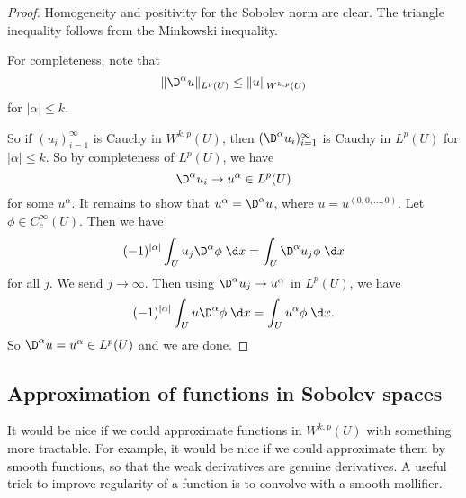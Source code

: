 \documentclass[a4paper]{article}
\begin{document}
\begin{proof}
  Homogeneity and positivity for the Sobolev norm are clear. The triangle inequality follows from the Minkowski inequality.

  For completeness, note that
  \[
    \|\D^\alpha u\|_{L^p(U)} \leq \|u\|_{W^{k, p}(U)}
  \]
  for $|\alpha| \leq k$.

  So if $(u_i)_{i = 1}^\infty$ is Cauchy in $W^{k, p}(U)$, then $(\D^\alpha u_i)_{i = 1}^\infty$ is Cauchy in $L^p(U)$ for $|\alpha| \leq k$. So by completeness of $L^p(U)$, we have
  \[
    \D^{\alpha}u_i \to u^\alpha \in L^p(U)
  \]
  for some $u^\alpha$. It remains to show that $u^\alpha = \D^\alpha u$, where $u = u^{(0, 0, \ldots, 0)}$. Let $\phi \in C_c^\infty(U)$. Then we have
  \[
    (-1)^{|\alpha|} \int_U u_j \D^\alpha \phi \;\d x = \int_U \D^\alpha u_j \phi\;\d x
  \]
  for all $j$. We send $j \to \infty$. Then using $\D^\alpha u_j \to u^\alpha$ in $L^p(U)$, we have
  \[
    (-1)^{|\alpha|} \int_U u \D^\alpha \phi\;\d x = \int_U u^\alpha \phi\;\d x.
  \]
  So $\D^\alpha u = u^\alpha \in L^p(U)$ and we are done.
\end{proof}

\subsection{Approximation of functions in Sobolev spaces}
It would be nice if we could approximate functions in $W^{k, p}(U)$ with something more tractable. For example, it would be nice if we could approximate them by smooth functions, so that the weak derivatives are genuine derivatives. A useful trick to improve regularity of a function is to convolve with a smooth mollifier.
\end{document}

